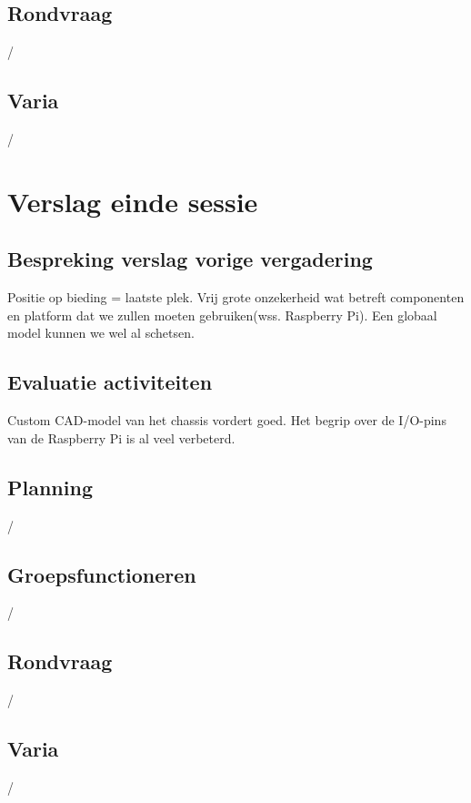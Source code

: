 \documentclass[a4paper,kulak]{kulakarticle} %
\begin{document}
\subsection{Rondvraag}
/
\subsection{Varia}
/



\section{Verslag einde sessie}

\subsection{Bespreking verslag vorige vergadering}
Positie op bieding = laatste plek. Vrij grote onzekerheid wat betreft componenten en platform dat we zullen moeten gebruiken(wss. Raspberry Pi). Een globaal model kunnen we wel al schetsen.

\subsection{Evaluatie activiteiten}
Custom CAD-model van het chassis vordert goed. Het begrip over de I/O-pins van de Raspberry Pi is al veel verbeterd.

\subsection{Planning}
/
\subsection{Groepsfunctioneren}
/
\subsection{Rondvraag}
/
\subsection{Varia}
/
\end{document}
